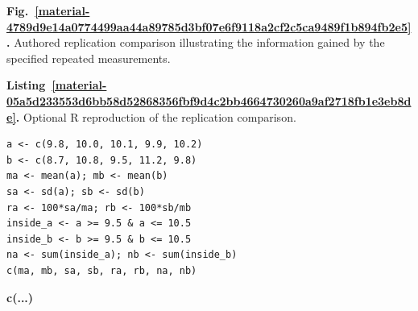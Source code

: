 \documentclass[11pt,a4paper]{article}
\newcounter{listing}
\begin{document}
\par\medskip
\Needspace{10cm}
\label{material-4789d9e14a0774499aa44a89785d3bf07e6f9118a2cf2c5ca9489f1b894fb2e5}
\noindent\textbf{Fig.~\ref*{material-4789d9e14a0774499aa44a89785d3bf07e6f9118a2cf2c5ca9489f1b894fb2e5}.} Authored replication comparison illustrating the information gained by the specified repeated measurements.\par\nopagebreak
\begin{center}
\end{center}


\medskip

\par\medskip
{}
\label{material-05a5d233553d6bb58d52868356fbf9d4c2bb4664730260a9af2718fb1e3eb8de}
\noindent\textbf{Listing~\ref*{material-05a5d233553d6bb58d52868356fbf9d4c2bb4664730260a9af2718fb1e3eb8de}.} Optional R reproduction of the replication comparison.\par\nopagebreak
\begin{Verbatim}[fontsize=\footnotesize,breaklines=true,breakanywhere=true]
a <- c(9.8, 10.0, 10.1, 9.9, 10.2)
b <- c(8.7, 10.8, 9.5, 11.2, 9.8)
ma <- mean(a); mb <- mean(b)
sa <- sd(a); sb <- sd(b)
ra <- 100*sa/ma; rb <- 100*sb/mb
inside_a <- a >= 9.5 & a <= 10.5
inside_b <- b >= 9.5 & b <= 10.5
na <- sum(inside_a); nb <- sum(inside_b)
c(ma, mb, sa, sb, ra, rb, na, nb)
\end{Verbatim}

\par\noindent\textbf{c(...)}
\end{document}
